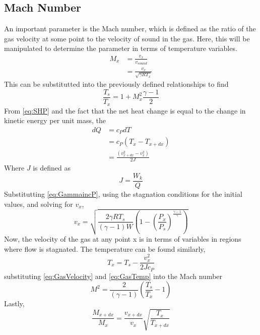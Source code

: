 \subsection{Mach Number}
An important parameter is the Mach number, which is defined as the ratio of the gas velocity at some point to the velocity of sound in the gas. Here, this will be manipulated to determine the parameter in terms of temperature variables.
\begin{align}\label{eq:DefineMach}
M_x&=\frac{v_x}{v_{sound}}\\
&=\frac{v_x}{\sqrt{\gamma R T_x}}
\end{align}%
This can be substitutted into the previously defined relationships to find
\begin{equation}\label{eq:1.25}
\frac{T_s}{T_x}=1+M_x^2\frac{\gamma-1}{2}
\end{equation}
From \ref{eq:SHP} and the fact that the net heat change is equal to the change in kinetic energy per unit mass, the
\begin{align}
dQ&=c_PdT\\
&=c_P(T_x-T_{x+dx})\\
&=\frac{(v_{x+dx}^2-v_x^2)}{2J}
\end{align}
Where $J$ is defined as
\begin{equation}
J=\frac{W_k}{Q}
\end{equation}%
Substitutting \ref{eq:GammaincP}, using the stagnation conditions for the initial values, and solving for $v_x$,
\begin{equation}\label{eq:GasVelocity}
v_x=\sqrt{\frac{2\gamma RT_s}{(\gamma-1)W}\left(1-\left(\frac{P_x}{P_s}\right)^{\frac{\gamma-1}{\gamma}}\right)}
\end{equation}
Now, the velocity of the gas at any point x is in terms of variables in regions where flow is stagnated. The temperature can be found similarly,
\begin{equation}\label{eq:GasTemp}
T_x=T_s-\frac{v_x^2}{2Jc_P}
\end{equation}
substituting \ref{eq:GasVelocity} and \ref{eq:GasTemp} into the Mach number
\begin{equation}\label{eq:MachInTermsofT}
M^2=\frac{2}{(\gamma-1)}\left(\frac{T_s}{T_x}-1\right)
\end{equation}
Lastly,
\begin{equation}\label{eq:MRatio}
\frac{M_{x+dx}}{M_x}=\frac{v_{x+dx}}{v_x}\sqrt{\frac{T_x}{T_{x+dx}}}
\end{equation}
